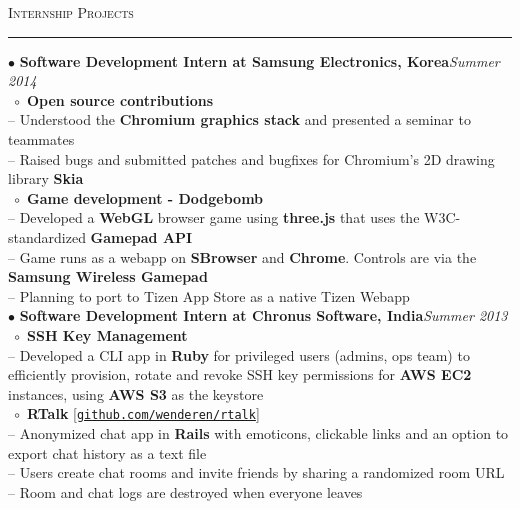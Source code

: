 \documentclass[a4paper,9pt]{article}
\begin{document}
\large{\textsc{Internship Projects}}\vspace{1.5pt}
\hrule\vspace{0.25cm}
\small
$\bullet$ \textbf{Software Development Intern at Samsung Electronics, Korea}\hfill \textit{Summer 2014}\\
$\;\circ$ \textbf{Open source contributions}\\
-- Understood the \textbf{Chromium graphics stack} and presented a seminar to teammates\\
-- Raised bugs and submitted patches and bugfixes for Chromium's 2D drawing library \textbf{Skia}\\
$\;\circ$ \textbf{Game development - Dodgebomb}\\
-- Developed a \textbf{WebGL} browser game using \textbf{three.js} that uses the W3C-standardized \textbf{Gamepad API}\\
-- Game runs as a webapp on \textbf{SBrowser} and \textbf{Chrome}. Controls are via the \textbf{Samsung Wireless Gamepad}\\
-- Planning to port to Tizen App Store as a native Tizen Webapp\\
$\bullet$ \textbf{Software Development Intern at Chronus Software, India}\hfill \textit{Summer 2013}\\
$\;\circ$ \textbf{SSH Key Management}\\
-- Developed a CLI app in \textbf{Ruby} for privileged users (admins, ops team) to efficiently provision, rotate and revoke SSH key permissions for \textbf{AWS EC2} instances, using \textbf{AWS S3} as the keystore\\
$\;\circ$ \textbf{RTalk} [\href{https://github.com/wenderen/rtalk}{\texttt{github.com/wenderen/rtalk}}]\\
-- Anonymized chat app in \textbf{Rails} with emoticons, clickable links and an option to export chat history as a text file\\
-- Users create chat rooms and invite friends by sharing a randomized room URL\\
-- Room and chat logs are destroyed when everyone leaves\\
\end{document}

